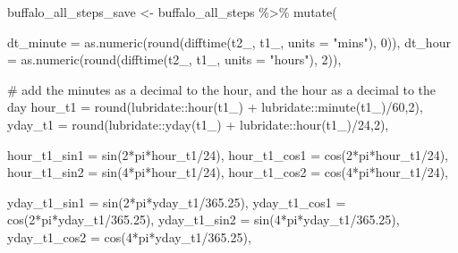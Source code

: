 \documentclass[
  letterpaper,
  DIV=11,
  numbers=noendperiod]{scrartcl}
\newenvironment{Shaded}{\begin{snugshade}}{\end{snugshade}}
\newcommand{\AttributeTok}[1]{\textcolor[rgb]{0.40,0.45,0.13}{#1}}
\newcommand{\CommentTok}[1]{\textcolor[rgb]{0.37,0.37,0.37}{#1}}
\newcommand{\DecValTok}[1]{\textcolor[rgb]{0.68,0.00,0.00}{#1}}
\newcommand{\FloatTok}[1]{\textcolor[rgb]{0.68,0.00,0.00}{#1}}
\newcommand{\FunctionTok}[1]{\textcolor[rgb]{0.28,0.35,0.67}{#1}}
\newcommand{\NormalTok}[1]{\textcolor[rgb]{0.00,0.23,0.31}{#1}}
\newcommand{\OtherTok}[1]{\textcolor[rgb]{0.00,0.23,0.31}{#1}}
\newcommand{\SpecialCharTok}[1]{\textcolor[rgb]{0.37,0.37,0.37}{#1}}
\newcommand{\StringTok}[1]{\textcolor[rgb]{0.13,0.47,0.30}{#1}}
\begin{document}
\begin{Shaded}
\begin{Highlighting}[]
\NormalTok{buffalo\_all\_steps\_save }\OtherTok{\textless{}{-}}\NormalTok{ buffalo\_all\_steps }\SpecialCharTok{\%\textgreater{}\%} \FunctionTok{mutate}\NormalTok{(}
  
  \AttributeTok{dt\_minute =} \FunctionTok{as.numeric}\NormalTok{(}\FunctionTok{round}\NormalTok{(}\FunctionTok{difftime}\NormalTok{(t2\_, t1\_, }\AttributeTok{units =} \StringTok{"mins"}\NormalTok{), }\DecValTok{0}\NormalTok{)),}
  \AttributeTok{dt\_hour =} \FunctionTok{as.numeric}\NormalTok{(}\FunctionTok{round}\NormalTok{(}\FunctionTok{difftime}\NormalTok{(t2\_, t1\_, }\AttributeTok{units =} \StringTok{"hours"}\NormalTok{), }\DecValTok{2}\NormalTok{)),}
  
  \CommentTok{\# add the minutes as a decimal to the hour, and the hour as a decimal to the day}
  \AttributeTok{hour\_t1 =} \FunctionTok{round}\NormalTok{(lubridate}\SpecialCharTok{::}\FunctionTok{hour}\NormalTok{(t1\_) }\SpecialCharTok{+}\NormalTok{ lubridate}\SpecialCharTok{::}\FunctionTok{minute}\NormalTok{(t1\_)}\SpecialCharTok{/}\DecValTok{60}\NormalTok{,}\DecValTok{2}\NormalTok{),}
  \AttributeTok{yday\_t1 =} \FunctionTok{round}\NormalTok{(lubridate}\SpecialCharTok{::}\FunctionTok{yday}\NormalTok{(t1\_) }\SpecialCharTok{+}\NormalTok{ lubridate}\SpecialCharTok{::}\FunctionTok{hour}\NormalTok{(t1\_)}\SpecialCharTok{/}\DecValTok{24}\NormalTok{,}\DecValTok{2}\NormalTok{),}
  
  \AttributeTok{hour\_t1\_sin1 =} \FunctionTok{sin}\NormalTok{(}\DecValTok{2}\SpecialCharTok{*}\NormalTok{pi}\SpecialCharTok{*}\NormalTok{hour\_t1}\SpecialCharTok{/}\DecValTok{24}\NormalTok{),}
  \AttributeTok{hour\_t1\_cos1 =} \FunctionTok{cos}\NormalTok{(}\DecValTok{2}\SpecialCharTok{*}\NormalTok{pi}\SpecialCharTok{*}\NormalTok{hour\_t1}\SpecialCharTok{/}\DecValTok{24}\NormalTok{),}
  \AttributeTok{hour\_t1\_sin2 =} \FunctionTok{sin}\NormalTok{(}\DecValTok{4}\SpecialCharTok{*}\NormalTok{pi}\SpecialCharTok{*}\NormalTok{hour\_t1}\SpecialCharTok{/}\DecValTok{24}\NormalTok{),}
  \AttributeTok{hour\_t1\_cos2 =} \FunctionTok{cos}\NormalTok{(}\DecValTok{4}\SpecialCharTok{*}\NormalTok{pi}\SpecialCharTok{*}\NormalTok{hour\_t1}\SpecialCharTok{/}\DecValTok{24}\NormalTok{),}
  
  \AttributeTok{yday\_t1\_sin1 =} \FunctionTok{sin}\NormalTok{(}\DecValTok{2}\SpecialCharTok{*}\NormalTok{pi}\SpecialCharTok{*}\NormalTok{yday\_t1}\SpecialCharTok{/}\FloatTok{365.25}\NormalTok{),}
  \AttributeTok{yday\_t1\_cos1 =} \FunctionTok{cos}\NormalTok{(}\DecValTok{2}\SpecialCharTok{*}\NormalTok{pi}\SpecialCharTok{*}\NormalTok{yday\_t1}\SpecialCharTok{/}\FloatTok{365.25}\NormalTok{),}
  \AttributeTok{yday\_t1\_sin2 =} \FunctionTok{sin}\NormalTok{(}\DecValTok{4}\SpecialCharTok{*}\NormalTok{pi}\SpecialCharTok{*}\NormalTok{yday\_t1}\SpecialCharTok{/}\FloatTok{365.25}\NormalTok{),}
  \AttributeTok{yday\_t1\_cos2 =} \FunctionTok{cos}\NormalTok{(}\DecValTok{4}\SpecialCharTok{*}\NormalTok{pi}\SpecialCharTok{*}\NormalTok{yday\_t1}\SpecialCharTok{/}\FloatTok{365.25}\NormalTok{),}
  

\end{Highlighting}
\end{Shaded}
\end{document}
